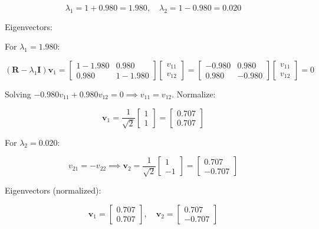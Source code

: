 \begin{enumerate}
    \[
    \lambda_1 = 1 + 0.980 = 1.980, \quad \lambda_2 = 1 - 0.980 = 0.020
    \]
    
    Eigenvectors:
    
    For $\lambda_1 = 1.980$:
    
    \[
    (\mathbf{R} - \lambda_1 \mathbf{I})\mathbf{v}_1 =
    \begin{bmatrix}
    1-1.980 & 0.980 \\
    0.980 & 1-1.980
    \end{bmatrix} 
    \begin{bmatrix} v_{11} \\ v_{12} \end{bmatrix} =
    \begin{bmatrix}
    -0.980 & 0.980 \\
    0.980 & -0.980
    \end{bmatrix}
    \begin{bmatrix} v_{11} \\ v_{12} \end{bmatrix} = 0
    \]
    
    Solving $-0.980 v_{11} + 0.980 v_{12} = 0 \implies v_{11} = v_{12}$. Normalize:
    
    \[
    \mathbf{v}_1 = \frac{1}{\sqrt{2}}
    \begin{bmatrix} 1 \\ 1 \end{bmatrix} =
    \begin{bmatrix} 0.707 \\ 0.707 \end{bmatrix}
    \]
    
    For $\lambda_2 = 0.020$:
    
    \[
    v_{21} = -v_{22} \implies
    \mathbf{v}_2 = \frac{1}{\sqrt{2}}
    \begin{bmatrix} 1 \\ -1 \end{bmatrix} =
    \begin{bmatrix} 0.707 \\ -0.707 \end{bmatrix}
    \]


    Eigenvectors (normalized):

    \[
    \mathbf{v}_1 = 
    \begin{bmatrix}
    0.707 \\
    0.707
    \end{bmatrix}, \quad
    \mathbf{v}_2 =
    \begin{bmatrix}
    0.707 \\
    -0.707
    \end{bmatrix}
    \]


\end{enumerate}
